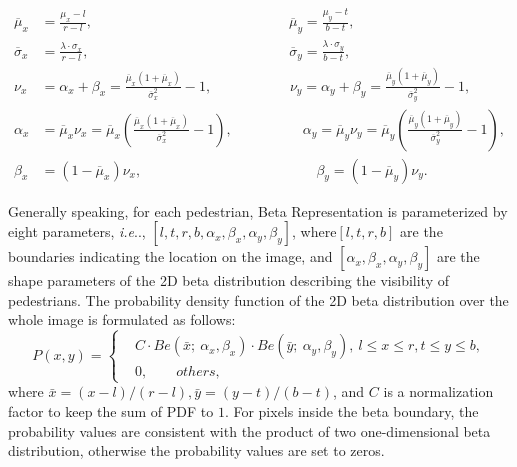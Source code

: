 \documentclass{article}
\makeatletter
\DeclareRobustCommand\onedot{\futurelet\@let@token\@onedot}
\def\@onedot{\ifx\@let@token.\else.\null\fi\xspace}
\def\ie{\emph{i.e}\onedot} \def\Ie{\emph{I.e}\onedot}
\makeatother
\begin{document}
\begin{equation}
    \begin{split}
        \overline{\mu}_x &= \frac{\mu_x - l}{r - l}, 
        \qquad \qquad \qquad \qquad \qquad \qquad \qquad
        \overline{\mu}_y = \frac{\mu_y - t}{b - t},\\
        \overline{\sigma}_x & = \frac{\lambda \cdot \sigma_x}{r - l}, 
        \qquad \qquad \qquad \qquad \qquad \qquad \qquad \;
        \overline{\sigma}_y  = \frac{\lambda \cdot \sigma_y}{b - t} ,\\
        \nu_x & = \alpha_x + \beta_x = \frac{\overline{\mu}_x (1 + \overline{\mu}_x)}{\overline{\sigma}_x^2} - 1,
        \qquad \qquad \quad \; \;
        \nu_y  = \alpha_y + \beta_y = \frac{\overline{\mu}_y (1 + \overline{\mu}_y)}{\overline{\sigma}_y^2} - 1 ,\\
        \alpha_x & = \overline{\mu}_x \nu_x = \overline{\mu}_x (\frac{\overline{\mu}_x (1 + \overline{\mu}_x)}{\overline{\sigma}_x^2} - 1), \qquad \qquad \quad
        \alpha_y  = \overline{\mu}_y \nu_y = \overline{\mu}_y (\frac{\overline{\mu}_y (1 + \overline{\mu}_y)}{\overline{\sigma}_y^2} - 1) ,\\
        \beta_x & = (1 - \overline{\mu}_x) \nu_x,
        \qquad \qquad \qquad \qquad \qquad \qquad \; \, 
\beta_y  = (1 - \overline{\mu}_y) \nu_y  .
\end{split}
\end{equation}

Generally speaking, for each pedestrian, Beta Representation is parameterized by eight parameters, \ie, $[l, t, r, b, \alpha_x, \beta_x, \alpha_y, \beta_y]$, where$[l, t, r, b]$ are the boundaries indicating the location on the image, and $[\alpha_x, \beta_x, \alpha_y, \beta_y]$ are the shape parameters of the 2D beta distribution describing the visibility of pedestrians.
The probability density function of the 2D beta distribution over the whole image is formulated as follows:
\begin{equation}
    P(x, y) = \left\{
    \begin{aligned}
        & C \cdot Be(\bar x;\  \alpha_x, \beta_x) \cdot Be(\bar y;\  \alpha_y, \beta_y),\  l \leq x \leq r, t \leq y \leq b ,\\
        & 0,\qquad  others ,
    \end{aligned}
    \right.
\label{beta representation}
\end{equation}
where $\bar x = (x - l) / (r - l), \bar y = (y - t) / (b - t)$, and $C$ is a normalization factor to keep the sum of PDF to $1$. 
For pixels inside the beta boundary, the probability values are consistent with the product of two one-dimensional beta distribution, otherwise the probability values are set to zeros.
\end{document}
